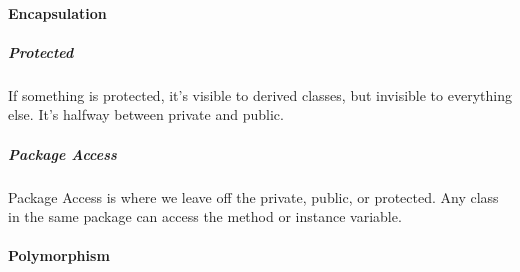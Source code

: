 \documentclass[10pt,a4paper]{article}
\begin{document}
\paragraph{Encapsulation}
\subparagraph{Protected}
If something is protected, it's visible to derived classes, but invisible to everything else. It's halfway between private and public.
\subparagraph{Package Access}
Package Access is where we leave off the private, public, or protected. Any class in the same package can access the method or instance variable.
\paragraph{Polymorphism}
\end{document}
